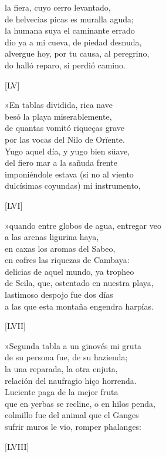 \documentclass[11pt,a4paper,twoside]{article}
\begin{document}
la fiera, cuyo cerro levantado,\\
de helvecias picas es muralla aguda;\\
la humana suya el caminante errado\\
dio ya a mi cueva, de piedad desnuda,\\
alvergue hoy, por tu causa, al peregrino,\\
do halló reparo, si perdió camino.\pend
\begin{center}
	[LV]
\end{center}\pstart
»En tablas dividida, rica nave\\
besó la playa miserablemente,\\
de quantas vomitó riqueças grave\\
por las vocas del Nilo de Orïente.\\
Yugo aquel día, y yugo bien süave,\\
del fiero mar a la sañuda frente\\
imponiéndole estava (si no al viento\\
dulcísimas coyundas) mi instrumento,\pend
\begin{center}
	[LVI]
\end{center}\pstart
»quando entre globos de agua, entregar veo\\
a las arenas ligurina haya,\\
en caxas los aromas del Sabeo,\\
en cofres las riquezas de Cambaya:\\
delicias de aquel mundo, ya tropheo\\
de Scila, que, ostentado en nuestra playa,\\
lastimoso despojo fue dos días\\
a las que esta montaña engendra harpías.\pend
\begin{center}
	[LVII]
\end{center}\pstart
»Segunda tabla a un ginovés mi gruta\\
de su persona fue, de su hazienda;\\
la una reparada, la otra enjuta,\\
relación del naufragio hiço horrenda.\\
Luciente paga de la mejor fruta\\
que en yerbas se recline, o en hilos penda,\\
colmillo fue del animal que el Ganges\\
sufrir muros le vio, romper phalanges:\pend
\begin{center}
	[LVIII]
\end{center}\pstart
\end{document}
